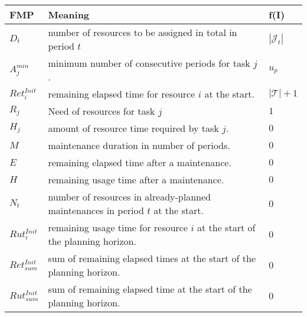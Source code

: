 \documentclass[a4paper,11pt]{article}
\begin{document}
    \begin{tabular}{l|l|l}
    	\textbf{FMP}    &  \textbf{Meaning} & \textbf{f(I)} \\ \hline
        $D_t$            & number of resources to be assigned in total in period $t$ & $|\mathcal{J}_t|$\\
        $A^{min}_j$      & minimum number of consecutive periods for task $j$. & $u_p$ \\
        $Ret^{Init}_{i}$ & remaining elapsed time for resource $i$ at the start. & $|\mathcal{T}| + 1$ \\
        $R_{j}$          & Need of resources for task $j$ & $1$ \\
        $H_j$             & amount of resource time required by task $j$. & $ 0$ \\
        $M$               & maintenance duration in number of periods. & $ 0$ \\
        $E$               & remaining elapsed time after a maintenance. & $ 0$ \\
        $H$               & remaining usage time after a maintenance.& $ 0$ \\
        $N_t$             & number of resources in already-planned maintenances in period $t$ at the start. & $0$ \\
        $Rut^{Init}_{i}$  & remaining usage time for resource $i$ at the start of the planning horizon. & $ 0$ \\
        $Ret^{Init}_{sum}$& sum of remaining elapsed times at the start of the planning horizon. & $ 0$\\
        $Rut^{Init}_{sum}$& sum of remaining elapsed time at the start of the planning horizon. & $ 0$ \\
    \end{tabular}



\clearpage



% 


\end{document}
